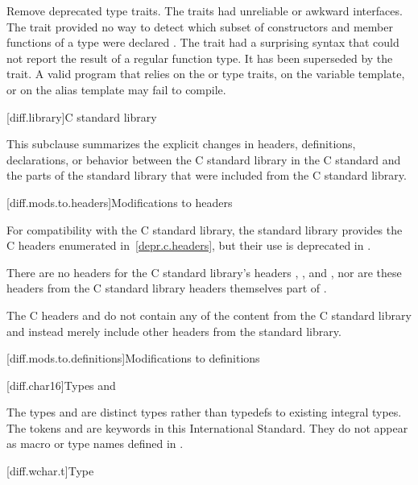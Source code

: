 \change
Remove deprecated type traits.
\rationale
The traits had unreliable or awkward interfaces. The 
trait provided no way to detect which subset of constructors and member
functions of a type were declared . The 
trait had a surprising syntax that could not report the result of a regular
function type. It has been superseded by the  trait.
\effect
A valid \CppXVII{} program that relies on the  or
 type traits, on the  variable template,
or on the  alias template may fail to compile.

[diff.library]{C standard library}
%

\pnum
This subclause summarizes the explicit changes in headers,
definitions, declarations, or behavior between the C standard library
in the C standard and the parts of the \Cpp{} standard library that were
included from the C standard library.

[diff.mods.to.headers]{Modifications to headers}

\pnum
For compatibility with the C standard library,
the \Cpp{} standard library provides the C headers enumerated
in~\ref{depr.c.headers}, but their use is deprecated in \Cpp{}.

\pnum
There are no \Cpp{} headers for the C standard library's headers
,
,
and ,
nor are these headers from the C standard library headers themselves part of \Cpp{}.

\pnum
The C headers  and
 do not contain any of the content from
the C standard library and instead merely include other headers from the \Cpp{}
standard library.

[diff.mods.to.definitions]{Modifications to definitions}

[diff.char16]{Types  and }

\pnum
The types  and 
are distinct types rather than typedefs to existing integral types.
The tokens  and 
are keywords in this International Standard.
They do not appear as macro or type names defined in
.

[diff.wchar.t]{Type }


